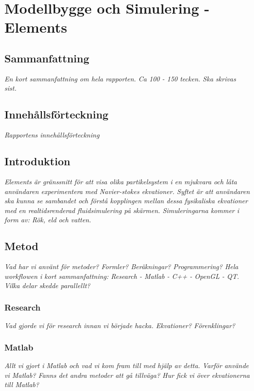 \documentclass[a4paper,12pt,twoside,swedish]{report}
\begin{document}
\pagestyle{plain}

\setcounter{page}{1}

\chapter{Modellbygge och Simulering - Elements}

\section{Sammanfattning}
\textit{En kort sammanfattning om hela rapporten. Ca 100 - 150 tecken. Ska skrivas sist.}

\section{Innehållsförteckning}
\textit{Rapportens innehållsförteckning}

\section{Introduktion}
\textit{Elements är gränssnitt för att visa olika partikelsystem i en mjukvara och låta användaren experimentera med Navier-stokes ekvationer. Syftet är att användaren ska kunna se sambandet och förstå kopplingen mellan dessa fysikaliska ekvationer med en realtidsrenderad fluidsimulering på skärmen. Simuleringarna kommer i form av: Rök, eld och vatten.}

\section{Metod}
\textit{Vad har vi använt för metoder? Formler? Beräkningar? Programmering? Hela workflowen i kort sammanfattning: Research - Matlab - C++ - OpenGL - QT. Vilka delar skedde parallellt?}

\subsection{Research}
\textit{Vad gjorde vi för research innan vi började hacka. Ekvationer? Förenklingar?}

\subsection{Matlab}
\textit{Allt vi gjort i Matlab och vad vi kom fram till med hjälp av detta. Varför använde vi Matlab? Fanns det andra metoder att gå tillväga? Hur fick vi över ekvationerna till Matlab?}
\end{document}
